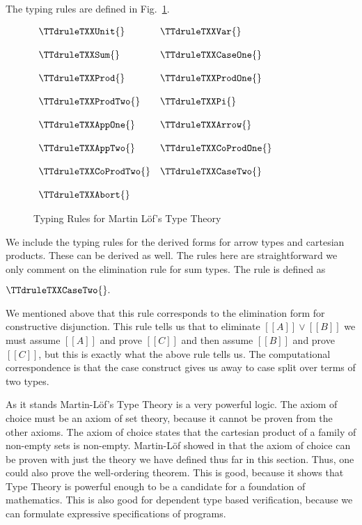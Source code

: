 The typing rules are defined in Fig.~\ref{fig:lof_typing}.
\begin{figure}
  \begin{center}
    \begin{math}
      \begin{array}{lll}
        \TTdruleTXXUnit{} & \TTdruleTXXVar{}\\
        &\\
        \TTdruleTXXSum{} & \TTdruleTXXCaseOne{}\\
        &\\
        \TTdruleTXXProd{} & \TTdruleTXXProdOne{}\\
        &\\
        \TTdruleTXXProdTwo{} & \TTdruleTXXPi{}\\
        &\\
        \TTdruleTXXAppOne{} & \TTdruleTXXArrow{}\\
        &\\
        \TTdruleTXXAppTwo{} & \TTdruleTXXCoProdOne{}\\
        &\\
        \TTdruleTXXCoProdTwo{} & \TTdruleTXXCaseTwo{}\\
        &\\
        \TTdruleTXXAbort{}
      \end{array}
    \end{math}
  \end{center}
  \caption{Typing Rules for Martin L\"of's Type Theory}
  \label{fig:lof_typing}
\end{figure}
We include the typing rules for the derived forms for arrow types
and cartesian products.  These can be derived as well.  The rules here
are straightforward we only comment on the elimination rule for sum
types.  The rule is defined as
\begin{center}
  \begin{math}
    \TTdruleTXXCaseTwo{}.
  \end{math}
\end{center}
We mentioned above that this rule corresponds to the elimination form
for constructive disjunction.  This rule tells us that to eliminate
$[[A]] \lor [[B]]$ we must assume $[[A]]$ and prove $[[C]]$ and then
assume $[[B]]$ and prove $[[C]]$, but this is exactly what the above
rule tells us.  The computational correspondence is that the case
construct gives us away to case split over terms of two types.

As it stands Martin-L\"of's Type Theory is a very powerful logic.  The
axiom of choice must be an axiom of set theory, because it cannot be
proven from the other axioms.  The axiom of choice states that the
cartesian product of a family of non-empty sets is non-empty.
Martin-L\"of showed in \cite{Martin:1984} that the axiom of choice can
be proven with just the theory we have defined thus far in this
section.  Thus, one could also prove the well-ordering theorem.  This
is good, because it shows that Type Theory is powerful enough to be a
candidate for a foundation of mathematics.  This is also good for
dependent type based verification, because we can formulate expressive
specifications of programs.

